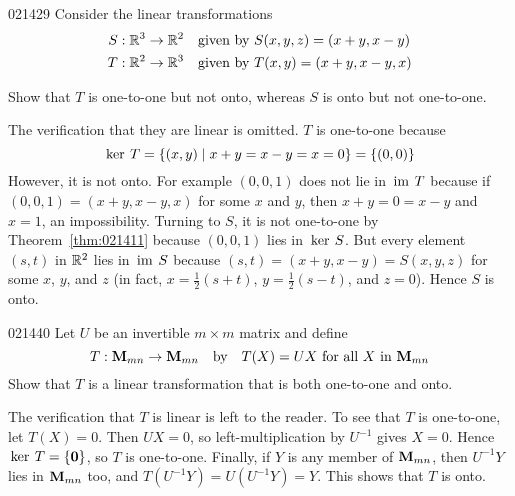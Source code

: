 \begin{example}{}{021429}
Consider the linear transformations
\begin{align*}
S& : \mathbb{R}^3 \to \mathbb{R}^2 \quad \mbox{given by } S(x, y, z) = (x + y, x - y) \\
T& : \mathbb{R}^2 \to \mathbb{R}^3 \quad \mbox{given by } T(x, y) = (x + y, x - y, x) 
\end{align*}

Show that $T$ is one-to-one but not onto, whereas $S$ is onto but not one-to-one.


\begin{solution}
  The verification that they are linear is omitted. $T$ is one-to-one because
\begin{equation*}
\thinspace\operatorname{ker \medspace}T = \{(x, y) \mid x + y = x - y = x = 0\} = \{(0, 0)\}
\end{equation*}
However, it is not onto. For example $(0, 0, 1)$ does not lie in $\thinspace\operatorname{im \medspace}T$ because if $(0, 0, 1) = (x + y, x - y, x)$ for some $x$ and $y$, then $x + y = 0 = x - y$ and $x = 1$, an impossibility. Turning to $S$, it is not one-to-one by Theorem~\ref{thm:021411} because $(0, 0, 1)$ lies in $\thinspace\operatorname{ker \medspace}S$. But every element $(s, t)$ in $\mathbb{R}^2$ lies in $\thinspace\operatorname{im \medspace}S$ because $(s, t) = (x + y, x - y) = S(x, y, z)$ for some $x$, $y$, and $z$ (in fact, $x = \frac{1}{2}(s + t)$, $y = \frac{1}{2}(s - t)$, and $z = 0$). Hence $S$ is onto.
\end{solution}
\end{example}

\begin{example}{}{021440}
Let $U$ be an invertible $m \times m$ matrix and define
\begin{equation*}
T : \textbf{M}_{mn} \to \textbf{M}_{mn} \quad \mbox{by} \quad T(X) = UX \mbox{ for all } X \mbox{ in } \textbf{M}_{mn}
\end{equation*}
Show that $T$ is a linear transformation that is both one-to-one and onto.


\begin{solution}
  The verification that $T$ is linear is left to the reader. To see that $T$ is one-to-one, let $T(X) = 0$. Then $UX = 0$, so left-multiplication by $U^{-1}$ gives $X = 0$. Hence $\thinspace\operatorname{ker \medspace}T = \{\textbf{0}\}$, so $T$ is one-to-one. Finally, if $Y$ is any member of $\textbf{M}_{mn}$, then $U^{-1}Y$ lies in $\textbf{M}_{mn}$ too, and $T(U^{-1}Y) = U(U^{-1}Y) = Y$. This shows that $T$ is onto.
\end{solution}
\end{example}

